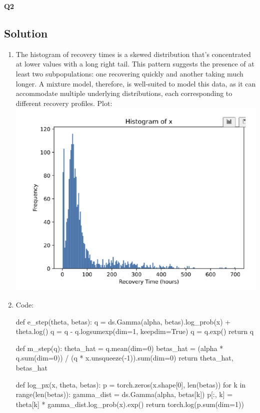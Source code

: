 \documentclass[submit]{harvardml}
\begin{document}
\newpage
\textbf{Q2}
\subsection*{Solution}

\begin{enumerate}
  \item The histogram of recovery times is a skewed distribution that's concentrated at lower values with a long right tail. This pattern suggests the presence of at least two subpopulations: one recovering quickly and another taking much longer. A mixture model, therefore, is well-suited to model this data, as it can accommodate multiple underlying distributions, each corresponding to different recovery profiles.
 Plot: \includegraphics[width=0.5\linewidth]{hw5/1.png}
  
  \item 
Code:

    \begin{python}
def e_step(theta, betas):
    q = ds.Gamma(alpha, betas).log_prob(x) + theta.log() 
    q = q - q.logsumexp(dim=1, keepdim=True)
    q = q.exp() 
    return q


def m_step(q):
    theta_hat = q.mean(dim=0)
    betas_hat = (alpha * q.sum(dim=0)) / (q * x.unsqueeze(-1)).sum(dim=0)
    return theta_hat, betas_hat

def log_px(x, theta, betas):
    p = torch.zeros(x.shape[0], len(betas))
    for k in range(len(betas)):
        gamma_dist = ds.Gamma(alpha, betas[k])
        p[:, k] = theta[k] * gamma_dist.log_prob(x).exp()
    return torch.log(p.sum(dim=1))



\end{python}
\end{enumerate}
\end{document}
